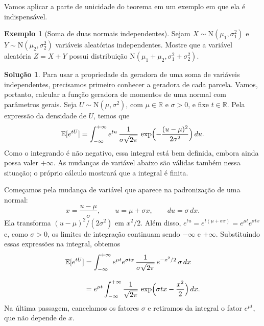 \documentclass[12pt,portuguese]{article}
\theoremstyle{definition}
\newtheorem{example}[example]{Exemplo}
\theoremstyle{plainexercise}
\theoremstyle{starredexercise}
\theoremstyle{definition}
\newtheorem*{solution}{Solução}
\begin{document}
\bigskip 

Vamos aplicar a parte de unicidade do teorema em um exemplo em que ela é
indispensável.

\bigskip 

\begin{example}[Soma de duas normais independentes]\label{ex:soma-normais}
Sejam $X\sim\mathrm{N}(\mu_1,\sigma_1^2)$ e
$Y\sim\mathrm{N}(\mu_2,\sigma_2^2)$ variáveis aleatórias independentes.
Mostre que a variável aleatória $Z = X+Y$ possui distribuição
$\mathrm{N}(\mu_1+\mu_2, \sigma_1^2+\sigma_2^2)$.
\begin{solution}
Para usar a propriedade da geradora de uma soma de variáveis independentes,
precisamos primeiro conhecer a geradora de cada parcela. Vamos, portanto,
calcular a função geradora de momentos de uma normal com parâmetros gerais.
Seja $U\sim\mathrm{N}(\mu,\sigma^2)$, com $\mu\in\mathbb{R}$ e
$\sigma>0$, e fixe $t\in\mathbb{R}$. Pela expressão da densidade de $U$,
temos que
\[
\mathbb{E}[e^{tU}]
=
\int_{-\infty}^{+\infty}
e^{tu}\,\frac{1}{\sigma\sqrt{2\pi}}\,
\exp\Bigl(-\frac{(u-\mu)^2}{2\sigma^2}\Bigr)\,du.
\]
Como o integrando é não negativo, essa integral está bem definida, embora
ainda possa valer $+\infty$. As mudanças de variável abaixo são válidas
também nessa situação; o próprio cálculo mostrará que a integral é finita.

Começamos pela mudança de variável que aparece na padronização de uma
normal:
\[
x=\frac{u-\mu}{\sigma},
\qquad u=\mu+\sigma x,
\qquad du=\sigma\,dx.
\]
Ela transforma $(u-\mu)^2/(2\sigma^2)$ em $x^2/2$. Além disso,
$e^{tu}=e^{t(\mu+\sigma x)}=e^{\mu t}e^{\sigma t x}$ e, como
$\sigma>0$, os limites de integração continuam sendo $-\infty$ e
$+\infty$. Substituindo essas expressões na integral, obtemos
\begin{align*}
\mathbb{E}[e^{tU}]
&=\int_{-\infty}^{+\infty}
e^{\mu t}e^{\sigma t x}\,
\frac{1}{\sigma\sqrt{2\pi}}\,e^{-x^2/2}\,\sigma\,dx
\\[0.3cm]
&=e^{\mu t}\int_{-\infty}^{+\infty}
\frac{1}{\sqrt{2\pi}}\,
\exp\Bigl(\sigma t x-\frac{x^2}{2}\Bigr)\,dx.
\end{align*}
Na última passagem, cancelamos os fatores $\sigma$ e retiramos da integral
o fator $e^{\mu t}$, que não depende de $x$.


\end{solution}
\end{example}
\end{document}
